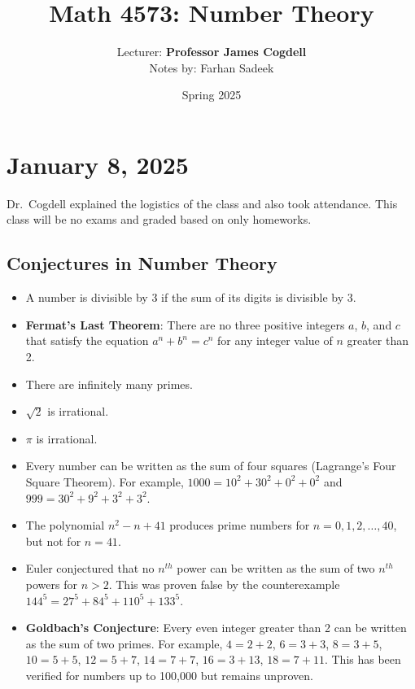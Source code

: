 \documentclass[11pt]{article}
\title{Math 4573: Number Theory}
\author{Lecturer: \textbf{Professor James Cogdell}\\Notes by: Farhan Sadeek}
\date{Spring 2025}
\begin{document}
\maketitle

\section{January 8, 2025}

Dr.\ Cogdell explained the logistics of the class and also took attendance.
This class will be no exams and graded based on only homeworks.

\subsection{Conjectures in Number Theory}
\begin{itemize}
    \item A number is divisible by 3 if the sum of its digits is divisible by 3.
    \item \textbf{Fermat's Last Theorem}: There are no three positive integers $a$, $b$, and $c$ that satisfy the equation $a^n + b^n = c^n$ for any integer value of $n$ greater than 2.
    \item There are infinitely many primes.
    \item $\sqrt{2}$ is irrational.
    \item $\pi$ is irrational.
    \item Every number can be written as the sum of four squares (Lagrange's Four Square
          Theorem). For example, $1000 = 10^2 + 30^2 + 0^2 + 0^2$ and $999 = 30^2 + 9^2 +
              3^2 + 3^2$.
    \item The polynomial $n^2 - n + 41$ produces prime numbers for $n = 0, 1, 2, \ldots,
              40$, but not for $n = 41$.
    \item Euler conjectured that no $n^{th}$ power can be written as the sum of two
          $n^{th}$ powers for $n > 2$. This was proven false by the counterexample $144^5
              = 27^5 + 84^5 + 110^5 + 133^5$.
    \item \textbf{Goldbach's Conjecture}: Every even integer greater than 2 can be written as the sum of two primes. For example, $4 = 2 + 2$, $6 = 3 + 3$, $8 = 3 + 5$, $10 = 5 + 5$, $12 = 5 + 7$, $14 = 7 + 7$, $16 = 3 + 13$, $18 = 7 + 11$. This has been verified for numbers up to 100,000 but remains unproven.
\end{itemize}
\end{document}
